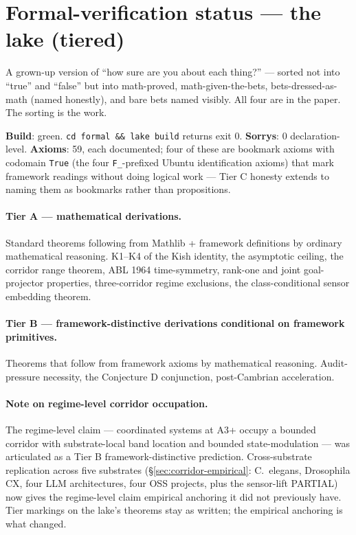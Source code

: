 \documentclass[11pt,a4paper]{article}
\begin{document}
\section{Formal-verification status --- the lake (tiered)}\label{sec:lake}

A grown-up version of ``how sure are you about each thing?'' --- sorted not into ``true'' and ``false'' but into math-proved, math-given-the-bets, bets-dressed-as-math (named honestly), and bare bets named visibly. All four are in the paper. The sorting is the work.

\textbf{Build}: green. \texttt{cd formal \&\& lake build} returns exit 0. \textbf{Sorrys}: 0 declaration-level. \textbf{Axioms}: 59, each documented; four of these are bookmark axioms with codomain \texttt{True} (the four \texttt{F\_}-prefixed Ubuntu identification axioms) that mark framework readings without doing logical work --- Tier C honesty extends to naming them as bookmarks rather than propositions.

\paragraph{Tier A --- mathematical derivations.} Standard theorems following from Mathlib + framework definitions by ordinary mathematical reasoning. K1--K4 of the Kish identity, the asymptotic ceiling, the corridor range theorem, ABL 1964 time-symmetry, rank-one and joint goal-projector properties, three-corridor regime exclusions, the class-conditional sensor embedding theorem.

\paragraph{Tier B --- framework-distinctive derivations conditional on framework primitives.} Theorems that follow from framework axioms by mathematical reasoning. Audit-pressure necessity, the Conjecture D conjunction, post-Cambrian acceleration.

\paragraph{Note on regime-level corridor occupation.} The regime-level claim --- coordinated systems at A3+ occupy a bounded corridor with substrate-local band location and bounded state-modulation --- was articulated as a Tier B framework-distinctive prediction. Cross-substrate replication across five substrates (\S\ref{sec:corridor-empirical}: C.~elegans, Drosophila CX, four LLM architectures, four OSS projects, plus the sensor-lift PARTIAL) now gives the regime-level claim empirical anchoring it did not previously have. Tier markings on the lake's theorems stay as written; the empirical anchoring is what changed.
\end{document}
